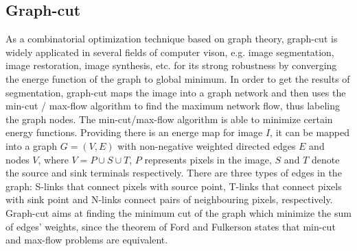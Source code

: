 \documentclass[journal]{IEEEtran}
\begin{document}
\subsection{Graph-cut}
As a combinatorial optimization technique based on graph theory, graph-cut is widely applicated in several fields of computer vison, e.g. image segmentation, image restoration, image synthesis, etc. for its strong robustness by converging the energe function of the graph to global minimum\cite{Boykov2004,Kwatra2003Graphcut}. In order to get the results of segmentation, graph-cut maps the image into a graph network and then uses the min-cut / max-flow algorithm to find the maximum network flow, thus labeling the graph nodes. The min-cut/max-flow algorithm is able to minimize certain energy functions. Providing there is an energe map for image $I$, it can be mapped into a graph $G=\left( V,E\right) $ with non-negative weighted directed edges $E$ and nodes $V$, where $V=P\cup  S\cup T$, $P$ represents pixels in the image, $S$ and $T$ denote the source and sink terminals respectively. There are three types of edges in the graph: S-links that connect pixels with source point, T-links that connect pixels with sink point and N-links connect pairs of neighbouring pixels, respectively. Graph-cut aims at finding the minimum cut of the graph which minimize the sum of edges' weights, since the theorem of Ford and Fulkerson states that min-cut and max-flow problems are equivalent\cite{FordJr2015}.\par
\end{document}
